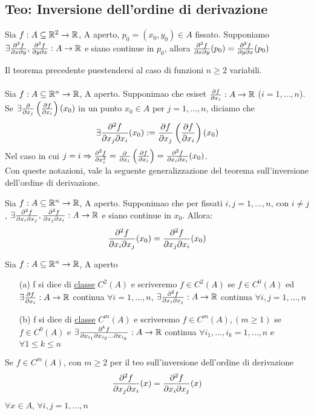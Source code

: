 \subsection{Teo: Inversione dell'ordine di derivazione}
\begin{theorem}
  Sia $f: A \subseteq \mathbb{R}^2 \to \mathbb{R}$, A aperto, $p_0 = (x_0,y_0)\in A$ fissato. Supponiamo $\exists \frac{\partial^2 f}{\partial x \partial y}, \frac{\partial^2 f}{\partial y \partial x} 
  : A \to \mathbb{R}$ e siano continue in $p_0$, allora $\frac{\partial^2 f}{\partial x \partial y}(p_0) 
  = \frac{\partial^2 f}{\partial y \partial x} (p_0)$
\end{theorem}
Il teorema precedente pu\aco estendersi al caso di funzioni $n\geq 2$ variabili. \\\\
Sia $f: A \subseteq \mathbb{R}^n \to \mathbb{R}$, A aperto. Supponimao che esiset $\frac{\partial f}{\partial x_i} :A \to \mathbb{R}$ ($i = 1,\dots,n$). \\
Se $\exists \frac{\partial }{\partial x_j}\left(\frac{\partial f}{\partial x_i}\right)(x_0)$ in un punto $x_0 \in A$ per 
$j = 1,\dots,n$, diciamo che 
$$\exists \frac{\partial^2 f}{\partial x_j \partial x_i} (x_0) := \frac{\partial f}{\partial x_j}\left(\frac{\partial f}{\partial x_i}\right)(x_0)$$
Nel caso in cui $j=i \Rightarrow \frac{\partial^2 f}{\partial x_i^2} = \frac{\partial }{\partial x_i}\left(
\frac{\partial f}{\partial x_i}\right) = \frac{\partial^2 f}{\partial x_i \partial x_i}(x_0)$. \\
Con queste notazioni, vale la seguente generalizzazione del teorema sull'inversione dell'ordine di derivazione.
\begin{theorem}
  Sia $f: A \subseteq \mathbb{R}^n \to \mathbb{R}$, A aperto. Supponimao che per fissati $i,j = 1,..., n$, con $i \neq j$, 
  $\exists \frac{\partial^2 f}{\partial x_i \partial x_j}, \frac{\partial^2 f}{\partial x_j \partial x_i} : A \to \mathbb{R}$ e siano 
  continue in $x_0$. Allora:
  $$\frac{\partial^2 f}{\partial x_i \partial x_j} (x_0) = \frac{\partial^2 f}{\partial x_j \partial x_i} (x_0)$$
\end{theorem}
\begin{definition}
  Sia $f: A \subseteq \mathbb{R}^n \to \mathbb{R}$, A aperto
  \begin{itemize}
    \item[(a)] f si dice di \underline{classe} $C^2(A)$ e scriveremo $f\in C^2(A)$ se $f \in C^0(A)$
              ed $\exists \frac{\partial f}{\partial x_i} : A \to \mathbb{R}$ continua $\forall i = 1,..., n$, 
              $\exists \frac{\partial^2 f}{\partial x_i \partial x_j} : A \to \mathbb{R}$ continua $\forall i,j = 1,..., n$
    \item[(b)]  f si dice di \underline{classe} $C^m(A)$ e scriveremo $f \in C^m(A), (m \geq 1)$ se $f \in C^0(A)$
              e $\exists \frac{\partial^k f}{\partial x_{i_1} \partial x_{i_2} \dots \partial x_{i_k}}:A \to \mathbb{R}$ continua $\forall i_1, ..., i_k = 1,..., n$
               e $\forall 1 \leq k \leq n$
  \end{itemize}
\end{definition}
\begin{osservazione}
  Se $f \in C^m(A)$, con $m\geq 2$ per il teo sull'inversione dell'ordine di derivazione 
  $$\frac{\partial^2 f}{\partial x_j \partial x_i}(x) = \frac{\partial^2 f}{\partial x_i \partial x_j}(x)$$
  $\forall x \in A$, $\forall i,j = 1,..., n$
\end{osservazione}
